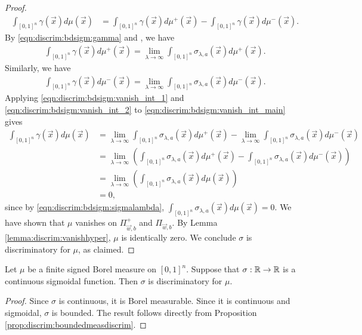 \begin{proof}
\begin{align}
    \label{eqn:discrim:bdsigm:vanish_int_main}
    \int_{[0,1]^n} \gamma(\vec{x}) d \mu  (\vec{x}) &=  \int_{[0,1]^n} \gamma(\vec{x}) d \mu^{+} (\vec{x}) -  \int_{[0,1]^n} \gamma(\vec{x}) d \mu^{-} (\vec{x}).
\end{align}
By \ref{eqn:discrim:bdsigm:gamma} and , we have \begin{align}
     \label{eqn:discrim:bdsigm:vanish_int_1}
     \int_{[0,1]^n} \gamma(\vec{x}) d \mu^{+} (\vec{x}) = \lim_{\lambda \to \infty}  \int_{[0,1]^n} \sigma_{\lambda, a} (\vec{x}) d \mu^{+} (\vec{x}).
\end{align}
Similarly, we have \begin{align}
     \label{eqn:discrim:bdsigm:vanish_int_2}
     \int_{[0,1]^n} \gamma(\vec{x}) d \mu^{-} (\vec{x}) = \lim_{\lambda \to \infty}  \int_{[0,1]^n} \sigma_{\lambda, a} (\vec{x}) d \mu^{-} (\vec{x}).
\end{align}
Applying \ref{eqn:discrim:bdsigm:vanish_int_1} and \ref{eqn:discrim:bdsigm:vanish_int_2} to \ref{eqn:discrim:bdsigm:vanish_int_main} gives
\begin{align*}
    \int_{[0,1]^n} \gamma(\vec{x}) d \mu  (\vec{x}) &= \lim_{\lambda \to \infty}  \int_{[0,1]^n} \sigma_{\lambda, a} (\vec{x}) d \mu^{+} (\vec{x}) - \lim_{\lambda \to \infty}  \int_{[0,1]^n} \sigma_{\lambda, a} (\vec{x}) d \mu^{-} (\vec{x}) & \\ 
                                                   &= \lim_{\lambda \to \infty} \left (\int_{[0,1]^n} \sigma_{\lambda, a} (\vec{x}) d \mu^{+} (\vec{x})  -\int_{[0,1]^n} \sigma_{\lambda, a} (\vec{x}) d \mu^{-} (\vec{x}) \right ) & \\ 
                                                   &= \lim_{\lambda \to \infty}\left (\int_{[0,1]^n} \sigma_{\lambda, a} (\vec{x}) d \mu  (\vec{x}) \right) &\\
                                                   &= 0,
\end{align*}
since by \ref{eqn:discrim:bdsigm:sigmalambda}, $\int_{[0,1]^n} \sigma_{\lambda, a} (\vec{x}) d \mu  (\vec{x}) = 0. $ We have shown that $\mu$ vanishes on $\Pi_{\vec{w}, b}^{+}$ and $\Pi_{\vec{w}, b}$. By Lemma \ref{lemma:discrim:vanishhyper}, $\mu$ is identically zero.
We conclude $\sigma$ is discriminatory for $\mu$, as claimed.
\end{proof}

\begin{proposition}
\label{prop:discrim:contsigmoidalarediscrim}
Let $\mu$ be a finite signed Borel measure on $[0,1]^n$. Suppose that $\sigma : {\mathbb R} \to {\mathbb R}$ is a continuous sigmoidal function. Then $\sigma$ is discriminatory for $\mu$. 
\end{proposition}
\begin{proof}
Since $\sigma$ is continuous, it is Borel measurable. Since it is continuous and sigmoidal, $\sigma$ is bounded. The result follows directly from
Proposition \ref{prop:discrim:boundedmeasdiscrim}.
\end{proof}

